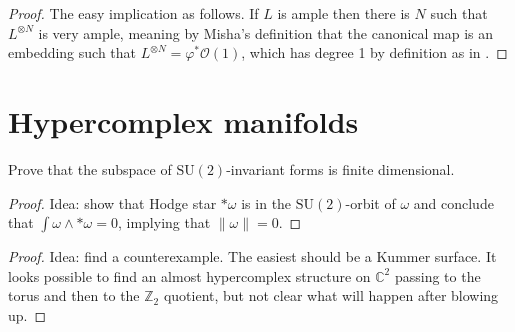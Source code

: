 \begin{proof}
The easy implication as follows. If $L$ is ample then there is $N$ such that
$L^{\otimes N}$ is very ample, meaning by Misha's definition that the canonical
map is an embedding such that $L^{\otimes N}=\varphi^*\mathcal{O}(1)$, which has
degree 1 by definition as in \cite[15.4.14]{sea}.
\end{proof}

\section{Hypercomplex manifolds}
\label{section-hypercomplex-manifolds}

\begin{exercise}
\label{exercise-SU2-invariant-forms}
Prove that the subspace of $\text{SU}(2)$-invariant forms is finite dimensional.
\end{exercise}

\begin{proof}
Idea: show that
Hodge star $*\omega$ is in the $\text{SU}(2)$-orbit of $\omega$ and conclude
that $\int \omega\wedge *\omega=0$, implying that $\|\omega\|=0$.
\end{proof}

\begin{exercise}
\label{exercise-closed-fundamental-forms-on-almost-hypercomplex-manifold}

\end{exercise}

\begin{proof}
Idea: find a counterexample. The easiest should be a Kummer surface. It looks
possible to find an almost hypercomplex structure on $\mathbb{C}^2$ passing to
the torus and then to the $\mathbb{Z}_2$ quotient, but not clear what will
happen after blowing up.
\end{proof}





